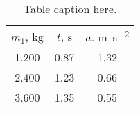 \begin{table}
\caption{\label{tab:newtable1} Table caption here.}
\begin{center}
\begin{ruledtabular}
\begin{tabular}{ccc}
$m_1$, \unit{\kilo\gram} & $t$, \unit{\second} & $a$. \unit{\meter\per\second\squared} \\ 
1.200 & 0.87 & 1.32 \\ 
2.400 & 1.23 & 0.66 \\ 
3.600 & 1.35 & 0.55 \\ 
\end{tabular}
\end{ruledtabular}
\end{center}
\end{table}

